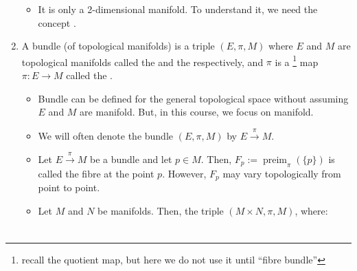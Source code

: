 \documentclass{article}
\begin{document}
\begin{enumerate}
\begin{itemize}
    \item {} It is only a 2-dimensional manifold. To understand it, we need the concept .
    \begin{center}
\end{center}
\end{itemize}
\item {}  A bundle (of topological manifolds) is a triple $(E, \pi, M)$ where $E$ and $M$ are topological manifolds called the  and the  respectively, and ${\pi}$ is a \footnote{recall the quotient map, but here we do not use it until ``fibre bundle''} map $\pi: E \rightarrow M$ called the .
\begin{itemize}
\item Bundle can be defined for the general topological space without assuming $E$ and $M$ are manifold. But, in this course, we focus on manifold.
    \item {} We will often denote the bundle $(E, \pi, M)$ by $E \stackrel{\pi}{\rightarrow} M$.
    \item {} Let $E \stackrel{\pi}{\rightarrow} M$ be a bundle and let $p \in M$. Then, $F_{p}:=\operatorname{preim}_{\pi}(\{p\})$ is called the fibre at the point $p$. However, $F_p$ may vary topologically from point to point.
   \item {} Let $M$ and $N$ be manifolds. Then, the triple $(M \times N, \pi, M)$, where:
\begin{align*}
\begin{aligned}

\end{aligned}
\end{align*}
\end{itemize}
\end{enumerate}
\end{document}
